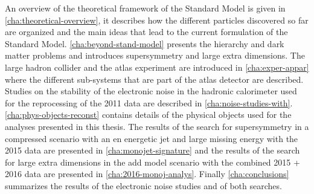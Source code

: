An overview of the theoretical framework of the Standard Model is given in
\cref{cha:theoretical-overview}, it describes how the different particles
discovered so far are organized and the main ideas that lead to the current
formulation of the Standard Model. \cref{cha:beyond-stand-model} presents the
hierarchy and dark matter problems and introduces supersymmetry and large extra
dimensions. The large hadron collider and the \gls{atlas} experiment are
introduced in \cref{cha:exper-appar} where the different sub-systems that are
part of the \gls{atlas} detector are described. Studies on the stability of the
electronic noise in the hadronic calorimeter used for the reprocessing of the
2011 data are described in
\cref{cha:noise-studies-with}. \cref{cha:phys-objects-reconst} contains details
of the physical objects used for the analyses presented in this thesis. The
results of the search for supersymmetry in a compressed scenario with an en
energetic jet and large missing energy with the 2015 data are presented in
\cref{cha:monojet-signature} and the results of the search for large extra
dimensions in the \gls{add} model scenario with the combined 2015 + 2016 data
are presented in \cref{cha:2016-monoj-analys}. Finally \cref{cha:conclusions}
summarizes the results of the electronic noise studies and of both searches.
